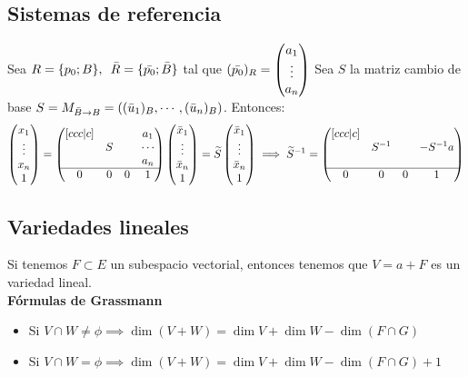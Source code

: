 \documentclass{article}
\begin{document}
\subsection{Sistemas de referencia}
Sea $R =\{p_0; B\}, \hspace{.5em} \Bar{R} =\{\Bar{p_0}; \Bar{B}\}$ tal que $(\Bar{p_0})_R = \begin{pmatrix}
    a_1 \\
    \vdots \\
    a_n
\end{pmatrix}$
Sea $S$ la matriz cambio de base $S = M_{\Bar{B}\to B} = ((\Bar{u}_1)_B, \cdots, (\Bar{u}_n)_B)$. Entonces:
\[
\begin{pmatrix}
    x_1 \\
    \vdots \\
    x_n \\
    1
\end{pmatrix}
= 
\begin{pmatrix}[ccc|c]
     &  &  & a_1 \\
     & S & & \cdots \\
     &  &  & a_n \\
    \hline
    0 & 0 & 0 & 1 \\
\end{pmatrix}
\begin{pmatrix}
    \Bar{x}_1 \\
    \vdots \\
    \Bar{x}_n \\
    1
\end{pmatrix}
=
\widetilde{S}
\begin{pmatrix}
    \Bar{x}_1 \\
    \vdots \\
    \Bar{x}_n \\
    1
\end{pmatrix}
\implies 
\widetilde{S}^{-1} = 
\begin{pmatrix}[ccc|c]
     &  &  &  \\
     & S^{-1} & & -S^{-1}a \\
     &  &  &  \\
    \hline
    0 & 0 & 0 & 1 \\
\end{pmatrix}
\]

\subsection{Variedades lineales}
Si tenemos $F\subset E$ un subespacio vectorial, entonces tenemos que $V = a+F$ es un variedad lineal. \\
\textbf{Fórmulas de Grassmann} 
\begin{itemize}
    \item Si $V\cap W \neq \phi \implies \dim(V+W)=\dim V + \dim W -\dim(F\cap G)$
    \item Si $V\cap W = \phi \implies \dim(V+W)=\dim V + \dim W -\dim(F\cap G)+1$
\end{itemize}
\end{document}
